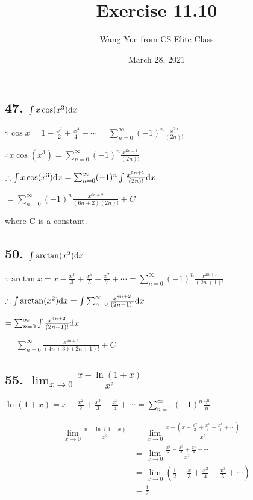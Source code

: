 \documentclass{article}
\begin{document}
    \title{Exercise 11.10}
    \author{Wang Yue from CS Elite Class}
    \date{March 28, 2021}
    \maketitle

    \subsection*{47. $\int x \cos(x^3) \textrm dx$}

    $\because \cos x = 1 - \frac{x^2}{2} + \frac{x^4}{4!} - \cdots = \sum_{n=0}^\infty (-1)^n \frac{x^{2n}}{(2n)!}$

    $\therefore x \cos(x^3) = \sum_{n=0}^\infty (-1)^n \frac{x^{6n+1}}{(2n)!}$

    $\therefore \int x \cos (x^3) \textrm dx = \sum_{n=0}^\infty (-1)^n \int \frac{x^{6n+1}}{(2n)!} \textrm dx$

    $= \sum_{n=0}^\infty (-1)^n \frac{x^{6n+2}}{(6n+2)(2n)!} + C$

    where C is a constant.

    \subsection*{50. $\int \arctan(x^2) \textrm dx$}

    $\because \arctan x = x - \frac{x^3}{3} + \frac{x^5}{5} - \frac{x^7}{7} + \cdots = \sum_{n=0}^\infty (-1)^n \frac{x^{2n+1}}{(2n+1)!}$

    $\therefore \int \arctan(x^2) \textrm dx = \int \sum_{n=0}^\infty \frac{x^{4n+2}}{(2n+1)!} \textrm dx$

    $ = \sum_{n=0}^\infty \int \frac{x^{4n+2}}{(2n+1)!} \textrm dx$

    $ = \sum_{n=0}^\infty \frac{x^{4n+3}}{(4n+3)(2n+1)!} + C$

    \subsection*{55. $\lim_{x\to 0}\frac{x - \ln(1+x)}{x^2}$}

    $\ln(1+x) = x - \frac{x^2}{2} + \frac{x^3}{3} - \frac{x^4}{4} + \cdots = \sum_{n=1}^\infty (-1)^n \frac{x^n}{n}$

    $$\begin{aligned}
        \lim_{x\to 0}\frac{x - \ln(1+x)}{x^2} &= \lim_{x\to 0}\frac{x - (x - \frac{x^2}{2} + \frac{x^3}{3} - \frac{x^4}{4} + \cdots)}{x^2} \\
        &= \lim_{x\to 0}\frac{\frac{x^2}{2} - \frac{x^3}{3} + \frac{x^4}{4} - \cdots}{x^2} \\
        &= \lim_{x\to 0}(\frac{1}{2} - \frac{x}{3} + \frac{x^2}{4} - \frac{x^3}{5} + \cdots) \\
        &= \frac 1 2
    \end{aligned}$$
\end{document}
